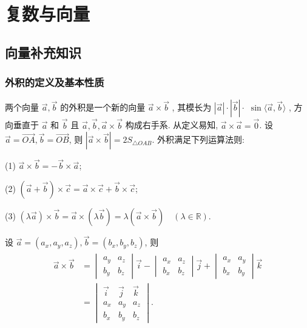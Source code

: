 \chapter{复数与向量}

\section{向量补充知识}
\subsection{外积的定义及基本性质}
两个向量 $\vec{a} , \vec{b}$ 的外积是一个新的向量 $\vec{a} \times \vec{b}$ , 其模长为 $|\vec{a}| \cdot|\vec{b}| \cdot$ $\sin \langle\vec{a}, \vec{b}\rangle$ , 方向垂直于 $\vec{a}$ 和 $\vec{b}$ 且 $\vec{a} , \vec{b} , \vec{a} \times \vec{b}$ 构成右手系.
从定义易知, $\vec{a} \times \vec{a}=\overrightarrow{0}$. 设 $\vec{a}=\overrightarrow{O A}, \vec{b}=\overrightarrow{O B}$, 则 $|\vec{a} \times \vec{b}|=2 S_{\triangle O A B}$.
外积满足下列运算法则:

(1) $\vec{a} \times \vec{b}=-\vec{b} \times \vec{a}$;

(2) $(\vec{a}+\vec{b}) \times \vec{c}=\vec{a} \times \vec{c}+\vec{b} \times \vec{c}$;

(3) $(\lambda \vec{a}) \times \vec{b}=\vec{a} \times(\lambda \vec{b})=\lambda(\vec{a} \times \vec{b}) \quad(\lambda \in \mathbb{R})$.

设 $\vec{a}=\left(a_x, a_y, a_z\right), \vec{b}=\left(b_x, b_y, b_z\right)$, 则
\begin{align*}
	\begin{aligned}
		\vec{a} \times \vec{b} & =\begin{vmatrix}
			                          a_y & a_z \\
			                          b_y & b_z
		                          \end{vmatrix} \vec{i}-\begin{vmatrix}
			                                                a_x & a_z \\
			                                                b_x & b_z
		                                                \end{vmatrix} \vec{j}+\begin{vmatrix}
			                                                                      a_x & a_y \\
			                                                                      b_x & b_y
		                                                                      \end{vmatrix} \vec{k} \\
		                       & =\begin{vmatrix}
			                          \vec{i} & \vec{j} & \vec{k} \\
			                          a_x     & a_y     & a_z     \\
			                          b_x     & b_y     & b_z
		                          \end{vmatrix} .
	\end{aligned}
\end{align*}

